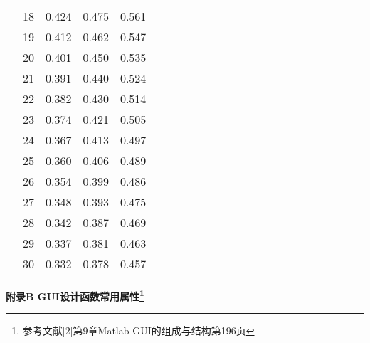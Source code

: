 \begin{tabular}{|p{4cm}<{\centering}|p{2cm}<{\centering}|p{2cm}<{\centering}|p{2cm}<{\centering}|p{2cm}<{\centering}|}
	&18	&0.424	&0.475	&0.561	\\	\cline{2-5}
	&19	&0.412	&0.462	&0.547	\\	\cline{2-5}
	&20	&0.401	&0.450	&0.535	\\	\cline{2-5}
	&21	&0.391	&0.440	&0.524	\\	\cline{2-5}
	&22	&0.382	&0.430	&0.514	\\	\cline{2-5}
	&23	&0.374	&0.421	&0.505	\\	\cline{2-5}
	&24	&0.367	&0.413	&0.497	\\	\cline{2-5}
	&25	&0.360	&0.406	&0.489	\\	\cline{2-5}
	&26	&0.354	&0.399	&0.486	\\	\cline{2-5}
	&27	&0.348	&0.393	&0.475	\\	\cline{2-5}
	&28	&0.342	&0.387	&0.469	\\	\cline{2-5}
	&29	&0.337	&0.381	&0.463	\\	\cline{2-5}
	&30	&0.332	&0.378	&0.457	\\	\hline
\end{tabular}
\newpage
\begin{center}
	\textbf{附录B GUI设计函数常用属性\footnote{参考文献[2]第9章Matlab GUI的组成与结构第196页}}
\end{center}
